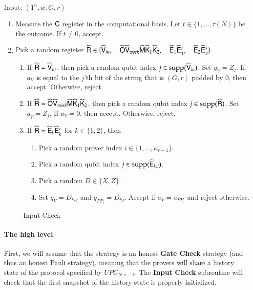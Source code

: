 \vspace{10pt}
\begin{center}
\begin{mdframed}
    Input: $(1^n,w,G,r)$ \\
	\begin{enumerate}
		\item Measure the ${\mathsf{C}}$ register in the computational basis. Let $t \in \{1,\ldots,\tau(N)\}$ be the outcome. If $t \neq 0$, accept.
		
		\item Pick a random register $\widehat{{\mathsf{R}}} \in \{ \widehat{{\mathsf{V}}}_{in}, \quad \widehat{{\mathsf{O}}} \widehat{{\mathsf{V}}}_{work} \widehat{{\mathsf{M}}} \widehat{{\mathsf{K}}}_1 \widehat{{\mathsf{K}}}_2, \quad \widehat{{\mathsf{E}}}_1 \widehat{{\mathsf{E}}}_1', \quad \widehat{{\mathsf{E}}}_2 \widehat{{\mathsf{E}}}_2' \}$.
		\begin{enumerate}
			\item If $\widehat{{\mathsf{R}}} = \widehat{{\mathsf{V}}}_{in}$, then pick a random qubit index $j \in \operatorname{supp}(\widehat{{\mathsf{V}}}_{in})$. Set $q_V = Z_j$. If $a_V$ is equal to the $j$'th bit of the string that is $(G,r)$ padded by $0$, then accept. Otherwise, reject.
			\item If $\widehat{{\mathsf{R}}} = \widehat{{\mathsf{O}}} \widehat{{\mathsf{V}}}_{work} \widehat{{\mathsf{M}}} \widehat{{\mathsf{K}}}_1 \widehat{{\mathsf{K}}}_2$, then pick a random qubit index $j \in \operatorname{supp}(\widehat{{\mathsf{R}}})$. Set $q_V = Z_j$. If $a_V = 0$, then accept. Otherwise, reject.
			\item If $\widehat{{\mathsf{R}}} = \widehat{{\mathsf{E}}}_k \widehat{{\mathsf{E}}}_k'$ for $k \in \{1,2\}$, then 
			\begin{enumerate}
				\item Pick a random prover index $i \in \{1,\ldots,\kappa_{r-1}\}$. 
				\item Pick a random qubit index $j \in \operatorname{supp}(\widehat{{\mathsf{E}}}_{k,i})$.
				\item Pick a random $D \in \{X,Z\}$.
				\item Set $q_V = D_{kij}$ and $q_{PP_i} = D_{kj}$. Accept if $a_V = a_{PP_i}$ and reject otherwise.
			\end{enumerate}
		\end{enumerate}
	\end{enumerate}    
\end{mdframed}
\end{center}
\begin{figure}[H]
\caption{Input Check}
\label{fig:input_check}
\end{figure}

\paragraph{The high level} First, we will assume that the strategy is an honest \textbf{Gate Check} strategy (and thus an honest Pauli strategy), meaning that the provers will share a history state of the protocol specified by $UPC_{N,r-1}$. The \textbf{Input Check} subroutine will check that the first snapshot of the history state is properly initialized.

